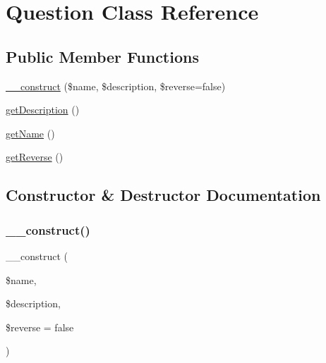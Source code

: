 \hypertarget{class_classes_1_1_test_1_1_question}{}\section{Question Class Reference}
\label{class_classes_1_1_test_1_1_question}
\subsection*{Public Member Functions}
\begin{DoxyCompactItemize}
\item 
\hyperlink{class_classes_1_1_test_1_1_question_a26d28169567272deb1df48eff53ed938}{\+\_\+\+\_\+construct} (\$name, \$description, \$reverse=false)
\item 
\hyperlink{class_classes_1_1_test_1_1_question_a2e7bb35c71bf1824456ceb944cb7a845}{get\+Description} ()
\item 
\hyperlink{class_classes_1_1_test_1_1_question_a3d0963e68bb313b163a73f2803c64600}{get\+Name} ()
\item 
\hyperlink{class_classes_1_1_test_1_1_question_a5a580ca3aa63e02e3f7907ac10c2f5d6}{get\+Reverse} ()
\end{DoxyCompactItemize}


\subsection{Constructor \& Destructor Documentation}
\mbox{\label{class_classes_1_1_test_1_1_question_a26d28169567272deb1df48eff53ed938}} 
\subsubsection{\texorpdfstring{\+\_\+\+\_\+construct()}{\_\_construct()}}
{\footnotesize\ttfamily \+\_\+\+\_\+construct (\begin{DoxyParamCaption}\item[{}]{\$name,  }\item[{}]{\$description,  }\item[{}]{\$reverse = {\ttfamily false} }\end{DoxyParamCaption})}



